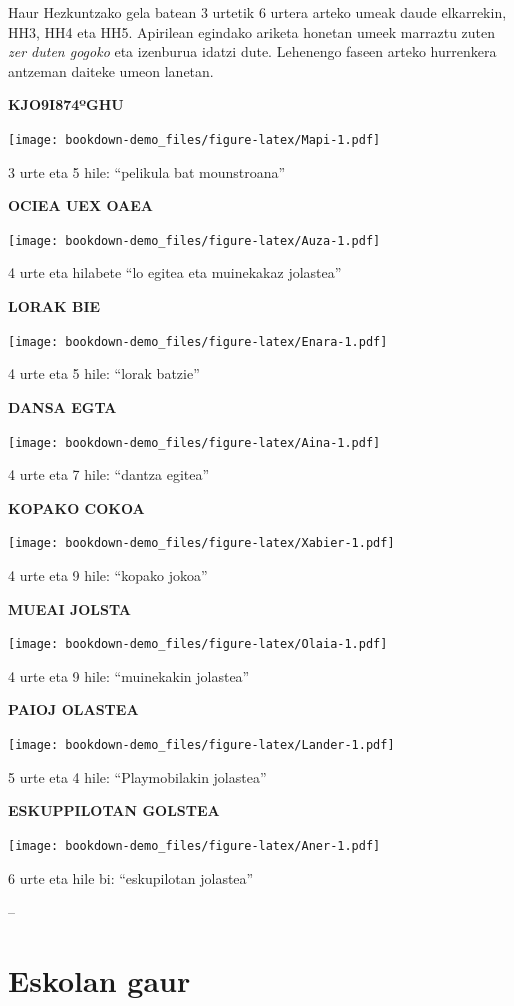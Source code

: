 \documentclass[]{book}
\begin{document}
Haur Hezkuntzako gela batean 3 urtetik 6 urtera arteko umeak daude elkarrekin, HH3, HH4 eta HH5. Apirilean egindako ariketa honetan umeek marraztu zuten \emph{zer duten gogoko} eta izenburua idatzi dute. Lehenengo faseen arteko hurrenkera antzeman daiteke umeon lanetan.

\textbf{KJO9I874ºGHU}

\texttt{[image: bookdown-demo\_files/figure-latex/Mapi-1.pdf]}

3 urte eta 5 hile: ``pelikula bat mounstroana''

\textbf{OCIEA UEX OAEA}

\texttt{[image: bookdown-demo\_files/figure-latex/Auza-1.pdf]}

4 urte eta hilabete ``lo egitea eta muinekakaz jolastea''

\textbf{LORAK BIE}

\texttt{[image: bookdown-demo\_files/figure-latex/Enara-1.pdf]}

4 urte eta 5 hile: ``lorak batzie''

\textbf{DANSA EGTA}

\texttt{[image: bookdown-demo\_files/figure-latex/Aina-1.pdf]}

4 urte eta 7 hile: ``dantza egitea''

\textbf{KOPAKO COKOA}

\texttt{[image: bookdown-demo\_files/figure-latex/Xabier-1.pdf]}

4 urte eta 9 hile: ``kopako jokoa''

\textbf{MUEAI JOLSTA}

\texttt{[image: bookdown-demo\_files/figure-latex/Olaia-1.pdf]}

4 urte eta 9 hile: ``muinekakin jolastea''

\textbf{PAIOJ OLASTEA}

\texttt{[image: bookdown-demo\_files/figure-latex/Lander-1.pdf]}

5 urte eta 4 hile: ``Playmobilakin jolastea''

\textbf{ESKUPPILOTAN GOLSTEA}

\texttt{[image: bookdown-demo\_files/figure-latex/Aner-1.pdf]}

6 urte eta hile bi: ``eskupilotan jolastea''

--

\hypertarget{eskolan-gaur}{%
\section{Eskolan gaur}\label{eskolan-gaur}}
\end{document}
